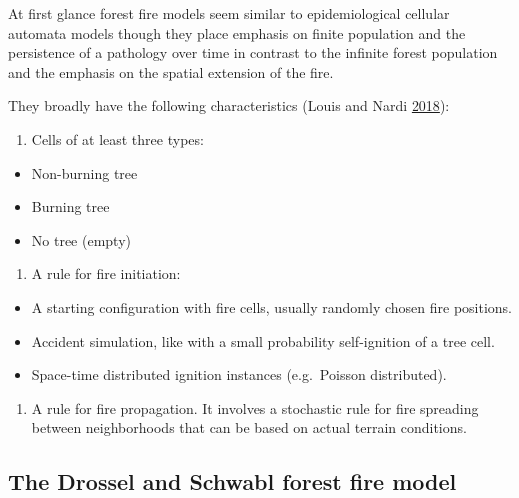 \documentclass[
]{book}
\providecommand{\tightlist}{%
  \setlength{\itemsep}{0pt}\setlength{\parskip}{0pt}}
\begin{document}
At first glance forest fire models seem similar to epidemiological cellular automata models though they place emphasis on finite population and the persistence of a pathology over time in contrast to the infinite forest population and the emphasis on the spatial extension of the fire.

They broadly have the following characteristics (Louis and Nardi \protect\hyperlink{ref-louis2018probabilistic}{2018}):

\begin{enumerate}
\def\labelenumi{\arabic{enumi}.}
\tightlist
\item
  Cells of at least three types:
\end{enumerate}

\begin{itemize}
\tightlist
\item
  Non-burning tree
\item
  Burning tree
\item
  No tree (empty)
\end{itemize}

\begin{enumerate}
\def\labelenumi{\arabic{enumi}.}
\setcounter{enumi}{1}
\tightlist
\item
  A rule for fire initiation:
\end{enumerate}

\begin{itemize}
\tightlist
\item
  A starting configuration with fire cells, usually randomly chosen fire positions.
\item
  Accident simulation, like with a small probability self-ignition of a tree cell.
\item
  Space-time distributed ignition instances (e.g.~Poisson distributed).
\end{itemize}

\begin{enumerate}
\def\labelenumi{\arabic{enumi}.}
\setcounter{enumi}{2}
\tightlist
\item
  A rule for fire propagation. It involves a stochastic rule for fire spreading between neighborhoods that can be based on actual terrain conditions.
\end{enumerate}

\hypertarget{the-drossel-and-schwabl-forest-fire-model}{%
\subsection{The Drossel and Schwabl forest fire model}\label{the-drossel-and-schwabl-forest-fire-model}}
\end{document}
